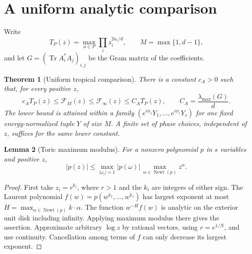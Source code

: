 \documentclass[11pt]{article}
\newtheorem{theorem}{Theorem}
\newtheorem{lemma}[theorem]{Lemma}
\newcommand{\Tr}{\operatorname{Tr}}
\newcommand{\Newt}{\operatorname{Newt}}
\newcommand{\F}{\mathcal F}
\begin{document}
\section{A uniform analytic comparison}
Write
\[
 T_P(z)=\max_{u\in P}\prod_i z_i^{2u_i/d},\qquad M=\max\{1,d-1\},
\]
and let $G=(\Tr A_i^*A_j)_{i,j}$ be the Gram matrix of the coefficients.

\begin{theorem}[Uniform tropical comparison]\label{thm:main}
There is a constant $c_A>0$ such that, for every positive $z$,
\begin{equation}
 c_A T_P(z)\le \F_M(z)\le\F_\infty(z)
 \le C_A T_P(z),\qquad C_A=\frac{\lambda_{\max}(G)}{d}.\label{eq:sandwich}
\end{equation}
The lower bound is attained within a family
$(e^{i\phi_1}Y_1,\ldots,e^{i\phi_s}Y_s)$ for one fixed energy-normalized tuple $Y$ of size $M$. A finite set of phase choices, independent of $z$, suffices for the same lower constant.
\end{theorem}

\begin{lemma}[Toric maximum modulus]\label{lem:toric}
For a nonzero polynomial $p$ in $s$ variables and positive $z$,
\[
 |p(z)|\le\max_{|\omega_i|=1}|p(\omega)|\,
       \max_{\alpha\in\Newt(p)}z^\alpha.
\]
\end{lemma}
\begin{proof}
First take $z_i=r^{k_i}$, where $r>1$ and the $k_i$ are integers of either sign. The Laurent polynomial $f(w)=p(w^{k_1},\ldots,w^{k_s})$ has largest exponent at most
$H=\max_{\alpha\in\Newt(p)}k\cdot\alpha$. The function $w^{-H}f(w)$ is analytic on the exterior unit disk including infinity. Applying maximum modulus there gives the assertion. Approximate arbitrary $\log z$ by rational vectors, using $r=e^{1/N}$, and use continuity. Cancellation among terms of $f$ can only decrease its largest exponent.
\end{proof}
\end{document}
